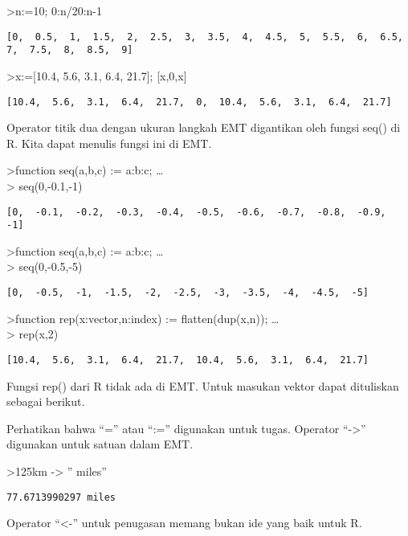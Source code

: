 \documentclass[
]{book}
\begin{document}
\textgreater n:=10; 0:n/20:n-1

\begin{verbatim}
[0,  0.5,  1,  1.5,  2,  2.5,  3,  3.5,  4,  4.5,  5,  5.5,  6,  6.5,
7,  7.5,  8,  8.5,  9]
\end{verbatim}

\textgreater x:={[}10.4, 5.6, 3.1, 6.4, 21.7{]}; {[}x,0,x{]}

\begin{verbatim}
[10.4,  5.6,  3.1,  6.4,  21.7,  0,  10.4,  5.6,  3.1,  6.4,  21.7]
\end{verbatim}

Operator titik dua dengan ukuran langkah EMT digantikan oleh fungsi seq() di R. Kita dapat menulis fungsi ini di EMT.

\textgreater function seq(a,b,c) := a:b:c; \ldots{}\\
\textgreater{} seq(0,-0.1,-1)

\begin{verbatim}
[0,  -0.1,  -0.2,  -0.3,  -0.4,  -0.5,  -0.6,  -0.7,  -0.8,  -0.9,  -1]
\end{verbatim}

\textgreater function seq(a,b,c) := a:b:c; \ldots{}\\
\textgreater{} seq(0,-0.5,-5)

\begin{verbatim}
[0,  -0.5,  -1,  -1.5,  -2,  -2.5,  -3,  -3.5,  -4,  -4.5,  -5]
\end{verbatim}

\textgreater function rep(x:vector,n:index) := flatten(dup(x,n)); \ldots{}\\
\textgreater{} rep(x,2)

\begin{verbatim}
[10.4,  5.6,  3.1,  6.4,  21.7,  10.4,  5.6,  3.1,  6.4,  21.7]
\end{verbatim}

Fungsi rep() dari R tidak ada di EMT. Untuk masukan vektor dapat dituliskan sebagai berikut.

Perhatikan bahwa ``='' atau ``:='' digunakan untuk tugas. Operator ``-\textgreater{}'' digunakan untuk satuan dalam EMT.

\textgreater125km -\textgreater{} '' miles''

\begin{verbatim}
77.6713990297 miles
\end{verbatim}

Operator ``\textless-'' untuk penugasan memang bukan ide yang baik untuk R.
\end{document}
